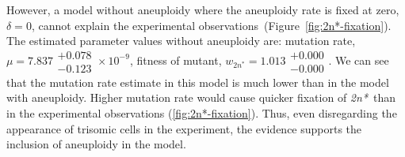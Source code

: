 \documentclass[12pt]{extarticle}
\newcommand{\eumt}{\emph{2n*}}
\begin{document}
However, a model without aneuploidy where the aneuploidy rate is fixed at zero, $\delta=0$, cannot explain the experimental observations~(Figure~\ref{fig:2n*-fixation}). The estimated parameter values without aneuploidy are: 
mutation rate, $\mu=7.837\substack{+0.078 \\ -0.123}\times10^{-9}$,
fitness of mutant, $w_{2n^*}=1.013\substack{+0.000 \\ -0.000}$. 
We can see that the mutation rate estimate in this model is much lower than in the model with aneuploidy. Higher mutation rate would cause quicker fixation of \eumt\ than in the experimental observations (\autoref{fig:2n*-fixation}). Thus, even disregarding the appearance of trisomic cells in the experiment, the evidence supports the inclusion of aneuploidy in the model.
\end{document}
